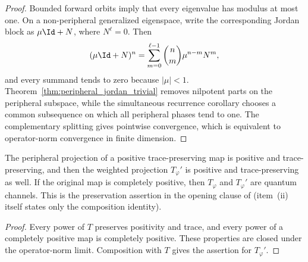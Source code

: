 \begin{proof}\leanok
    Bounded forward orbits imply that every eigenvalue has modulus at most
    one. On a non-peripheral generalized eigenspace, write the corresponding
    Jordan block as $\mu\Id+N$, where $N^\ell=0$. Then
    \begin{align}
        (\mu\Id+N)^n
        =\sum_{m=0}^{\ell-1}\binom{n}{m}\mu^{n-m}N^m,
    \end{align}
    and every summand tends to zero because $|\mu|<1$.
    Theorem~\ref{thm:peripheral_jordan_trivial} removes nilpotent parts on the
    peripheral subspace, while the simultaneous recurrence corollary chooses a
    common subsequence on which all peripheral
    phases tend to one. The complementary splitting gives pointwise
    convergence, which is equivalent to operator-norm convergence in finite
    dimension.
\end{proof}

\begin{corollary}
    \label{cor:peripheral_projection_channel}
    \leanok
    The peripheral projection of a positive trace-preserving map is positive
    and trace-preserving, and then the weighted projection $T_\varphi'$ is
    positive and trace-preserving as well. If the original map is completely
    positive, then $T_\varphi$ and $T_\varphi'$ are quantum channels. This
    is the preservation assertion in the opening clause of
    \cite[Proposition~6.3]{Wolf2012Quantum} (item~(ii) itself states only the
    composition identity).
\end{corollary}

\begin{proof}\leanok
    Every power of $T$ preserves positivity and trace, and every power of a
    completely positive map is completely positive. These properties are
    closed under the operator-norm limit. Composition with $T$ gives the
    assertion for $T_\varphi'$.
\end{proof}

